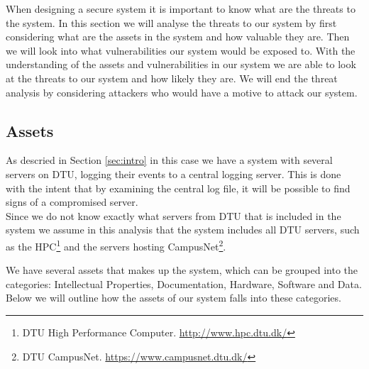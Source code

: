 \begin{comment}
on the security of log entries pre-dating the compromise of a logging machine.
Consequently, we require forward-secure stream integrity, that is, resistance
against post-compromise insertion, alteration, deletion and reordering of pre-
compromise log entries.
Traditional log integrity techniques involve using specialized write-only hard
disks or remote logging whereby copies of log entries are sent to several geo-
graphically distributed machines. With the former, disk substitution can result
in a complete integrity compromise of the entire log. In the latter, the remote
server may go offline (or become unreachable) and the logging machine then
ACM Transactions on Storage, Vol. 5, No. 1, Article 2, Publication date: March 2009.A New Approach to Secure Logging
has to locally buffer new log entries, which, in turn, become subject to attacks.
Furthermore, if the remote server is compromised, log file integrity cannot be
guaranteed.
\end{comment}

When designing a secure system it is important to know what are the threats to the system. In this section we will analyse the threats to our system by first considering what are the assets in the system and how valuable they are. Then we will look into what vulnerabilities our system would be exposed to. With the understanding of the assets and vulnerabilities in our system we are able to look at the threats to our system and how likely they are. We will end the threat analysis by considering attackers who would have a motive to attack our system.
\subsection{Assets}
As descried in Section \ref{sec:intro} in this case we have a system with several servers on DTU, logging their events to a central logging server. This is done with the intent that by examining the central log file, it will be possible to find signs of a compromised server.\\
Since we do not know exactly what servers from DTU that is included in the system we assume in this analysis that the system includes all DTU servers, such as the HPC\footnote{DTU High Performance Computer. \url{http://www.hpc.dtu.dk/}} and the servers hosting CampusNet\footnote{DTU CampusNet. \url{https://www.campusnet.dtu.dk/}}.

We have several assets that makes up the system, which can be grouped into the categories: Intellectual Properties, Documentation, Hardware, Software and Data. Below we will outline how the assets of our system falls into these categories.

